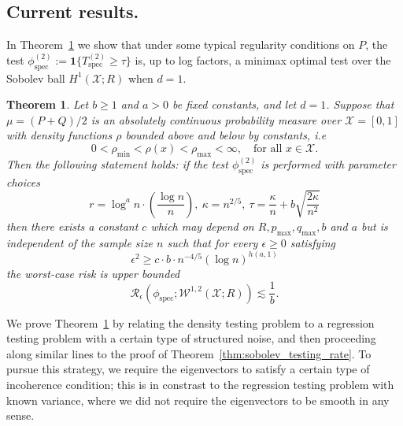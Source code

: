 \documentclass{article}
\newcommand{\1}{\mathbf{1}}
\newcommand{\spec}{\mathrm{spec}}
\theoremstyle{alden}
\theoremstyle{aldenthm}
\newtheorem{theorem}{Theorem}
\theoremstyle{definition}
\theoremstyle{remark}
\begin{document}
\subsection{Current results.}

In Theorem~\ref{thm:twosample_sobolev_testing_rate} we show that under some typical regularity conditions on $P$, the test $\phi_{\textrm{spec}}^{(2)} := \1\{T_{\mathrm{spec}}^{(2)} \geq \tau\}$ is, up to log factors, a minimax optimal test over the Sobolev ball $H^1(\mathcal{X};R)$ when $d = 1$.

\begin{theorem}
	\label{thm:twosample_sobolev_testing_rate}
	Let $b \geq 1$ and $a > 0$ be fixed constants, and let $d = 1$.  Suppose that $\mu = (P + Q)/2$ is an absolutely continuous probability measure over $\mathcal{X} = [0,1]$ with density functions $\rho$ bounded above and below by constants, i.e
	\begin{equation*}
	0 < \rho_{\min} < \rho(x) < \rho_{\max} < \infty, \quad \textrm{for all $x \in \mathcal{X}$.}
	\end{equation*}
	Then the following statement holds: if the test $\phi_{\spec}^{(2)}$ is performed with parameter choices 
	\begin{equation*}
	r = \log^a n \cdot \left(\frac{\log n}{n}\right), ~\kappa = n^{2/5}, ~\tau = \frac{\kappa}{n} + b\sqrt{\frac{2\kappa}{n^2}}
	\end{equation*}
	then there exists a constant $c$ which may depend on $R,p_{\max},q_{\max},b$ and $a$ but is independent of the sample size $n$ such that for every $\epsilon \geq 0$ satisfying
	\begin{equation}
	\label{eqn:twosample_sobolev_testing_rate}
	\epsilon^2 \geq c \cdot b \cdot n^{-4/5} (\log n)^{h(a,1)}
	\end{equation}
	the worst-case risk is upper bounded
	\begin{equation}
	\label{eqn:twosample_sobolev_testing_rate_1}
	\mathcal{R}_{\epsilon}(\phi_{\mathrm{spec}}; \mathcal{W}^{1,2}(\mathcal{X};R)) \lesssim \frac{1}{b}.
	\end{equation}
\end{theorem}

We prove Theorem~\ref{thm:twosample_sobolev_testing_rate} by relating the density testing problem to a regression testing problem with a certain type of structured noise, and then proceeding along similar lines to the proof of Theorem~\ref{thm:sobolev_testing_rate}. To pursue this strategy, we require the eigenvectors to satisfy a certain type of incoherence condition; this is in constrast to the regression testing problem with known variance, where we did not require the eigenvectors to be smooth in any sense.
\end{document}
